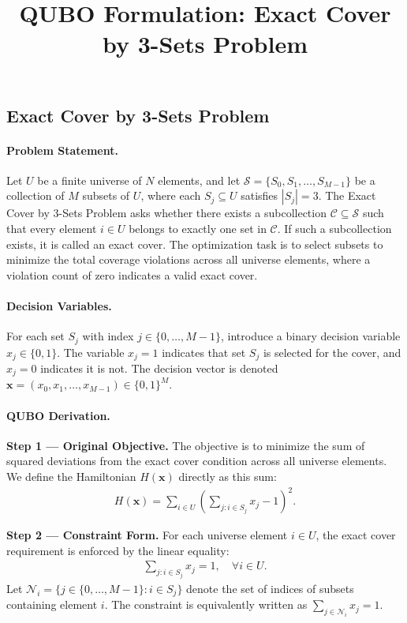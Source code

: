 \documentclass[12pt]{article}
\title{QUBO Formulation: Exact Cover by 3-Sets Problem}
\date{}
\begin{document}
\maketitle

\subsection*{Exact Cover by 3-Sets Problem}

\paragraph{Problem Statement.}
Let $U$ be a finite universe of $N$ elements, and let $\mathcal{S} = \{S_0, S_1, \dots, S_{M-1}\}$ be a collection of $M$ subsets of $U$, where each $S_j \subseteq U$ satisfies $|S_j| = 3$. The Exact Cover by 3-Sets Problem asks whether there exists a subcollection $\mathcal{C} \subseteq \mathcal{S}$ such that every element $i \in U$ belongs to exactly one set in $\mathcal{C}$. If such a subcollection exists, it is called an exact cover. The optimization task is to select subsets to minimize the total coverage violations across all universe elements, where a violation count of zero indicates a valid exact cover.

\paragraph{Decision Variables.}
For each set $S_j$ with index $j \in \{0, \dots, M-1\}$, introduce a binary decision variable $x_j \in \{0,1\}$. The variable $x_j = 1$ indicates that set $S_j$ is selected for the cover, and $x_j = 0$ indicates it is not. The decision vector is denoted $\mathbf{x} = (x_0, x_1, \dots, x_{M-1}) \in \{0,1\}^M$.

\paragraph{QUBO Derivation.}
\textbf{Step 1 --- Original Objective.} The objective is to minimize the sum of squared deviations from the exact cover condition across all universe elements. We define the Hamiltonian $H(\mathbf{x})$ directly as this sum:
\begin{align}
H(\mathbf{x}) = \sum_{i \in U} \left( \sum_{j: i \in S_j} x_j - 1 \right)^2.
\end{align}

\textbf{Step 2 --- Constraint Form.} For each universe element $i \in U$, the exact cover requirement is enforced by the linear equality:
\begin{align}
\sum_{j: i \in S_j} x_j = 1, \quad \forall i \in U.
\end{align}
Let $\mathcal{N}_i = \{ j \in \{0, \dots, M-1\} : i \in S_j \}$ denote the set of indices of subsets containing element $i$. The constraint is equivalently written as $\sum_{j \in \mathcal{N}_i} x_j = 1$.
\end{document}
